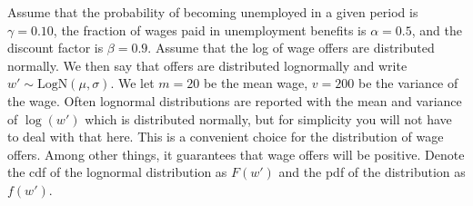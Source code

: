 Assume that the probability of becoming unemployed in a given period is $\gamma = 0.10$, the fraction of wages paid in unemployment benefits is $\alpha = 0.5$, and the discount factor is $\beta = 0.9$. Assume that the log of wage offers are distributed normally.  We then say that offers are distributed lognormally and write $w'\sim \text{LogN}(\mu,\sigma)$.  We let $m=20$ be the mean wage, $v=200$ be the variance of the wage.  Often lognormal distributions are reported with the mean and variance of $\log(w')$ which is distributed normally, but for simplicity you will not have to deal with that here. This is a convenient choice for the distribution of wage offers.  Among other things, it guarantees that wage offers will be positive.  Denote the cdf of the lognormal distribution as $F(w')$ and the pdf of the distribution as $f(w')$.

\vspace{5mm}


